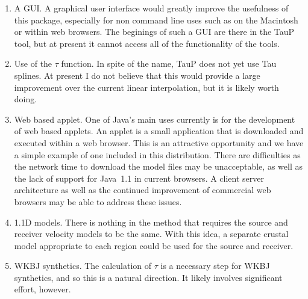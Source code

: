 \begin{enumerate}
\item A GUI. A graphical user interface would greatly improve the usefulness
of this package, especially for non command line uses such as on the Macintosh
or within web browsers. The beginings of such a GUI are there in the TauP tool,
but at present it cannot access all of the functionality of the tools.

\item Use of the $\tau$ function. In spite of the name, TauP does not yet use
Tau splines. At present I do not believe that this would provide a large
improvement over the current linear interpolation, but it is likely worth doing.

\item Web based applet. One of Java's main uses currently is for the development of web based applets. An applet is a small application that is downloaded and
executed within a web browser. This is an attractive opportunity and we have a simple
example of one included in this distribution.
There are difficulties as the network time to download the
model files may be unacceptable, as well as the lack of support for Java~1.1 in current browsers. A client server architecture as well as the continued improvement of commercial web browsers
may be able to address these issues.

\item 1.1D models. There is nothing in the method that requires the source and
receiver velocity models to be the same. With this idea, a separate crustal
model appropriate to each region could be used for the source and receiver.

\item WKBJ synthetics. The calculation of $\tau$ is a necessary step for WKBJ
synthetics, and so this is a natural direction. It likely involves significant
effort, however.
\end{enumerate}
